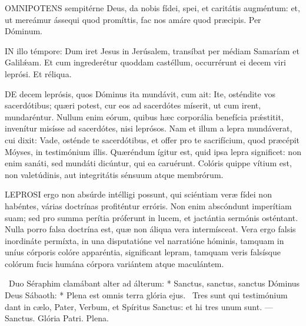 


\lettrine[lines=2]{O}{MNIPOTENS} sempitérne Deus, da nobis fídei, spei, et caritátis augméntum: et, ut mereámur ássequi quod promíttis, fac nos amáre quod præcipis. Per Dóminum.




\lettrine[lines=2]{I}{N} illo témpore: Dum iret Jesus in Jerúsalem, transíbat per médiam Samaríam et Galilǽam. Et cum ingrederétur quoddam castéllum, occurrérunt ei decem viri leprósi. Et réliqua.



\lettrine[lines=2]{D}{E} decem leprósis, quos Dóminus ita mundávit, cum ait: Ite, osténdite vos sacerdótibus; quæri potest, cur eos ad sacerdótes míserit, ut cum irent, mundaréntur. Nullum enim eórum, quibus hæc corporália benefícia prǽstitit, invenítur misísse ad sacerdótes, nisi leprósos. Nam et illum a lepra mundáverat, cui dixit: Vade, osténde te sacerdótibus, et offer pro te sacrifícium, quod præcépit Móyses, in testimónium illis. Quæréndum ígitur est, quid ipsa lepra significet: non enim sanáti, sed mundáti dicúntur, qui ea caruérunt. Colóris quippe vítium est, non valetúdinis, aut integritátis sénsuum atque membrórum.



\lettrine[lines=2]{L}{EPROSI} ergo non absúrde intélligi possunt, qui sciéntiam veræ fídei non habéntes, várias doctrínas profiténtur erróris. Non enim abscóndunt imperítiam suam; sed pro summa perítia próferunt in lucem, et jactántia sermónis osténtant. Nulla porro falsa doctrína est, quæ non áliqua vera intermísceat. Vera ergo falsis inordináte permíxta, in una disputatióne vel narratióne hóminis, tamquam in uníus córporis colóre apparéntia, significant lepram, tamquam veris falsísque colórum fucis humána córpora variántem atque maculántem.

\R\ Duo Séraphim clamábant alter ad álterum: * Sanctus, sanctus, sanctus Dóminus Deus Sábaoth: * Plena est omnis terra glória ejus. \V\ Tres sunt qui testimónium dant in cælo, Pater, Verbum, et Spíritus Sanctus: et hi tres unum sunt. — Sanctus. Glória Patri. Plena.

